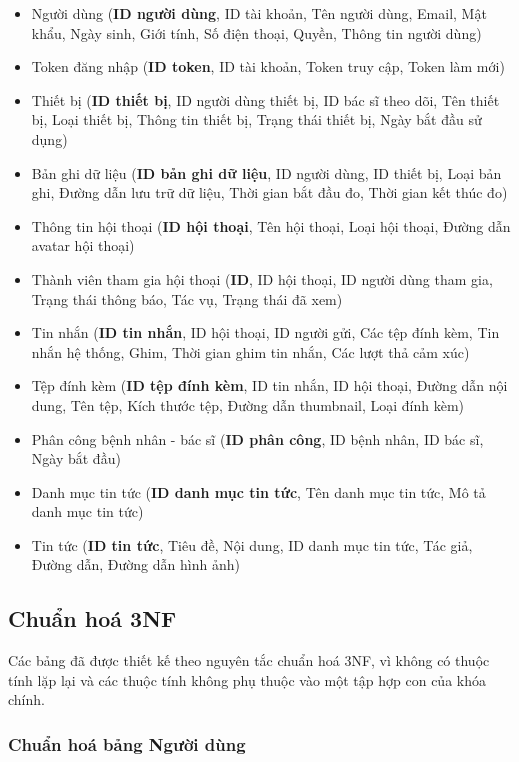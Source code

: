 \begin{itemize}
  \item Người dùng (\textbf{ID người dùng}, ID tài khoản, Tên người dùng, Email, Mật khẩu, Ngày sinh, Giới tính, Số điện thoại, Quyền, Thông tin người dùng)
  \item Token đăng nhập (\textbf{ID token}, ID tài khoản, Token truy cập, Token làm mới)
  \item Thiết bị (\textbf{ID thiết bị}, ID người dùng thiết bị, ID bác sĩ theo dõi, Tên thiết bị, Loại thiết bị, Thông tin thiết bị, Trạng thái thiết bị, Ngày bắt đầu sử dụng)
  \item Bản ghi dữ liệu (\textbf{ID bản ghi dữ liệu}, ID người dùng, ID thiết bị, Loại bản ghi, Đường dẫn lưu trữ dữ liệu, Thời gian bắt đầu đo, Thời gian kết thúc đo)
  \item Thông tin hội thoại (\textbf{ID hội thoại}, Tên hội thoại, Loại hội thoại, Đường dẫn avatar hội thoại)
  \item Thành viên tham gia hội thoại (\textbf{ID}, ID hội thoại, ID người dùng tham gia, Trạng thái thông báo, Tác vụ, Trạng thái đã xem)
  \item Tin nhắn (\textbf{ID tin nhắn}, ID hội thoại, ID người gửi, Các tệp đính kèm, Tin nhắn hệ thống, Ghim, Thời gian ghim tin nhắn, Các lượt thả cảm xúc)
  \item Tệp đính kèm (\textbf{ID tệp đính kèm}, ID tin nhắn, ID hội thoại, Đường dẫn nội dung, Tên tệp, Kích thước tệp, Đường dẫn thumbnail, Loại đính kèm)
  \item Phân công bệnh nhân - bác sĩ (\textbf{ID phân công}, ID bệnh nhân, ID bác sĩ, Ngày bắt đầu)
  \item Danh mục tin tức (\textbf{ID danh mục tin tức}, Tên danh mục tin tức, Mô tả danh mục tin tức)
  \item Tin tức (\textbf{ID tin tức}, Tiêu đề, Nội dung, ID danh mục tin tức, Tác giả, Đường dẫn, Đường dẫn hình ảnh)
\end{itemize}


\subsection{Chuẩn hoá 3NF}
Các bảng đã được thiết kế theo nguyên tắc chuẩn hoá 3NF, vì không có thuộc tính lặp lại và các thuộc tính không phụ thuộc vào một tập hợp con của khóa chính.

\subsubsection{Chuẩn hoá bảng Người dùng}
\mbox{}


